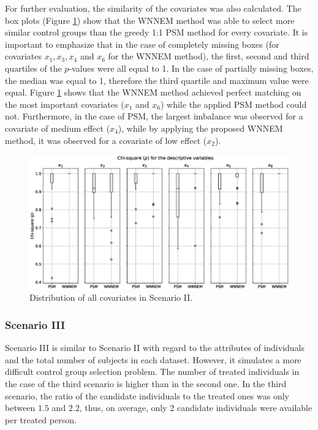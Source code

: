 										
		For further evaluation, the similarity of the covariates was also calculated. The box plots (Figure \ref{fig:wnnem_scen_II_distribution}) show that the WNNEM method was able to select more similar control groups than the greedy 1:1 PSM method for every covariate. It is important to emphasize that in the case of completely missing boxes (for covariates $x_1, x_3, x_4$ and $x_6$ for the WNNEM method), the first, second and third quartiles of the $p$-values were all equal to 1. In the case of partially missing boxes, the median was equal to 1, therefore the third quartile and maximum value were equal. Figure \ref{fig:wnnem_scen_II_distribution} shows that the WNNEM method achieved perfect matching on the most important covariates ($x_1$ and $x_6$) while the applied PSM method could not. Furthermore, in the case of PSM, the largest imbalance was observed for a covariate of medium effect ($x_4$), while by applying the proposed WNNEM method, it was observed for a covariate of low effect ($x_2$).
										
										
		\begin{figure}[h]
			\centering
			\captionsetup{justification=centering}
			\includegraphics[width=\textwidth]{assets/figures/control_group_selection/wnnem/scenII/distribution.eps}
			\caption{Distribution of all covariates in Scenario II. %
			}
			\label{fig:wnnem_scen_II_distribution}    
		\end{figure}
										
		\subsubsection{Scenario III}
		\label{sec:wnnem_scen_3}
										
		Scenario III is similar to Scenario II  with regard to the attributes of individuals and the total number of subjects in each dataset. However, it simulates a more difficult control group selection problem. The number of treated individuals in the case of the third scenario is higher than in the second one. In the third scenario, the ratio of the candidate individuals to the treated ones was only between $1.5$ and $2.2$, thus, on average, only 2 candidate individuals were available per treated person.    
										
